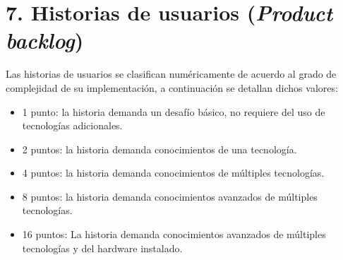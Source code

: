 \documentclass[
11pt, %
]{charter}
\begin{document}





\section{7. Historias de usuarios (\textit{Product backlog})}
\label{sec:backlog}



Las historias de usuarios se clasifican numéricamente de acuerdo al grado de complejidad de su implementación, a continuación se detallan dichos valores:

\begin{itemize}
	\item 1 punto: la historia demanda un desafío básico, no requiere del uso de tecnologías adicionales.
	\item 2 puntos: la historia demanda conocimientos de una tecnología.
	\item 4 puntos: la historia demanda conocimientos de múltiples tecnologías.
	\item 8 puntos: la historia demanda conocimientos avanzados de múltiples tecnologías.
	\item 16 puntos: La historia demanda conocimientos avanzados de múltiples tecnologías y del hardware instalado.
\end{itemize}
\end{document}
